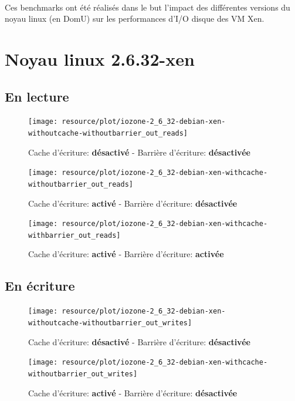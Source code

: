 \paragraph*{}
Ces benchmarks ont été réalisés dans le but l'impact des différentes versions du noyau linux
(en DomU) sur les performances d'I/O disque des VM Xen.


\section{Noyau linux 2.6.32-xen}

\subsection*{En lecture}

\begin{figure}[H]
	\centering
	\texttt{[image: resource/plot/iozone-2\_6\_32-debian-xen-withoutcache-withoutbarrier\_out\_reads]}
	\caption{Cache d'écriture: \textbf{désactivé}   -   Barrière d'écriture: \textbf{désactivée}}
\end{figure}

\begin{figure}[H]
	\centering
	\texttt{[image: resource/plot/iozone-2\_6\_32-debian-xen-withcache-withoutbarrier\_out\_reads]}
	\caption{Cache d'écriture: \textbf{activé}   -   Barrière d'écriture: \textbf{désactivée}}
\end{figure}

\begin{figure}[H]
	\centering
	\texttt{[image: resource/plot/iozone-2\_6\_32-debian-xen-withcache-withbarrier\_out\_reads]}
	\caption{Cache d'écriture: \textbf{activé}   -   Barrière d'écriture: \textbf{activée}}
\end{figure}

\subsection*{En écriture}

\begin{figure}[H]
	\centering
	\texttt{[image: resource/plot/iozone-2\_6\_32-debian-xen-withoutcache-withoutbarrier\_out\_writes]}
	\caption{Cache d'écriture: \textbf{désactivé}   -   Barrière d'écriture: \textbf{désactivée}}
\end{figure}

\begin{figure}[H]
	\centering
	\texttt{[image: resource/plot/iozone-2\_6\_32-debian-xen-withcache-withoutbarrier\_out\_writes]}
	\caption{Cache d'écriture: \textbf{activé}   -   Barrière d'écriture: \textbf{désactivée}}
\end{figure}

